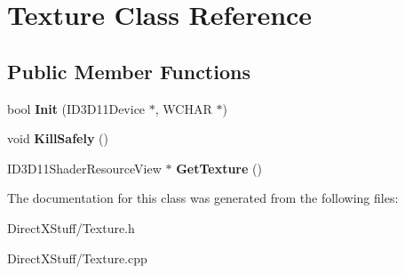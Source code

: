 \hypertarget{class_texture}{\section{Texture Class Reference}
\label{class_texture}
}
\subsection*{Public Member Functions}
\begin{DoxyCompactItemize}
\item 
\hypertarget{class_texture_a6c15e82b95f6eef0aed702e5b28863a0}{bool {\bfseries Init} (I\-D3\-D11\-Device $\ast$, W\-C\-H\-A\-R $\ast$)}\label{class_texture_a6c15e82b95f6eef0aed702e5b28863a0}

\item 
\hypertarget{class_texture_a78593fd8e3819b0fb6fcb7d9433df2bd}{void {\bfseries Kill\-Safely} ()}\label{class_texture_a78593fd8e3819b0fb6fcb7d9433df2bd}

\item 
\hypertarget{class_texture_ab65ab6c1e9a0a220b1e3a209628dbb05}{I\-D3\-D11\-Shader\-Resource\-View $\ast$ {\bfseries Get\-Texture} ()}\label{class_texture_ab65ab6c1e9a0a220b1e3a209628dbb05}

\end{DoxyCompactItemize}


The documentation for this class was generated from the following files\-:\begin{DoxyCompactItemize}
\item 
Direct\-X\-Stuff/Texture.\-h\item 
Direct\-X\-Stuff/Texture.\-cpp\end{DoxyCompactItemize}
